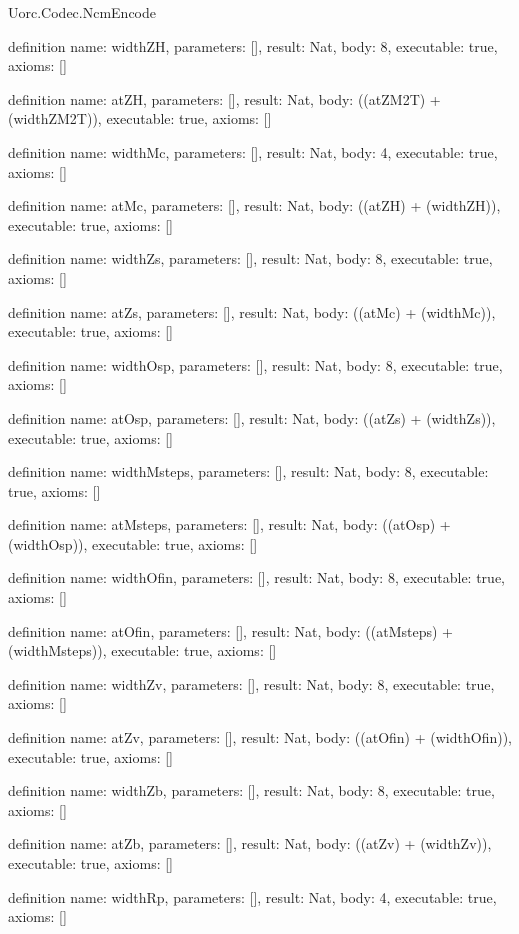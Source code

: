 \begin{lexlean}{Uorc.Codec.NcmEncode}
\begin{semanticmodule}
definition{
  name: widthZH,
  parameters: [],
  result: Nat,
  body: 8,
  executable: true,
  axioms: []
}

definition{
  name: atZH,
  parameters: [],
  result: Nat,
  body: ((atZM2T) + (widthZM2T)),
  executable: true,
  axioms: []
}

definition{
  name: widthMc,
  parameters: [],
  result: Nat,
  body: 4,
  executable: true,
  axioms: []
}

definition{
  name: atMc,
  parameters: [],
  result: Nat,
  body: ((atZH) + (widthZH)),
  executable: true,
  axioms: []
}

definition{
  name: widthZs,
  parameters: [],
  result: Nat,
  body: 8,
  executable: true,
  axioms: []
}

definition{
  name: atZs,
  parameters: [],
  result: Nat,
  body: ((atMc) + (widthMc)),
  executable: true,
  axioms: []
}

definition{
  name: widthOsp,
  parameters: [],
  result: Nat,
  body: 8,
  executable: true,
  axioms: []
}

definition{
  name: atOsp,
  parameters: [],
  result: Nat,
  body: ((atZs) + (widthZs)),
  executable: true,
  axioms: []
}

definition{
  name: widthMsteps,
  parameters: [],
  result: Nat,
  body: 8,
  executable: true,
  axioms: []
}

definition{
  name: atMsteps,
  parameters: [],
  result: Nat,
  body: ((atOsp) + (widthOsp)),
  executable: true,
  axioms: []
}

definition{
  name: widthOfin,
  parameters: [],
  result: Nat,
  body: 8,
  executable: true,
  axioms: []
}

definition{
  name: atOfin,
  parameters: [],
  result: Nat,
  body: ((atMsteps) + (widthMsteps)),
  executable: true,
  axioms: []
}

definition{
  name: widthZv,
  parameters: [],
  result: Nat,
  body: 8,
  executable: true,
  axioms: []
}

definition{
  name: atZv,
  parameters: [],
  result: Nat,
  body: ((atOfin) + (widthOfin)),
  executable: true,
  axioms: []
}

definition{
  name: widthZb,
  parameters: [],
  result: Nat,
  body: 8,
  executable: true,
  axioms: []
}

definition{
  name: atZb,
  parameters: [],
  result: Nat,
  body: ((atZv) + (widthZv)),
  executable: true,
  axioms: []
}

definition{
  name: widthRp,
  parameters: [],
  result: Nat,
  body: 4,
  executable: true,
  axioms: []
}


\end{semanticmodule}
\end{lexlean}
